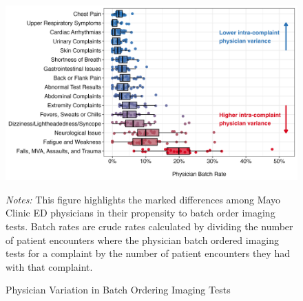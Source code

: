 \documentclass[,,nonblindrev]{informs}
\begin{document}
\begin{figure}[t] 
\centering
\caption{Physician Variation in Batch Ordering Imaging Tests}  
\includegraphics[width=\textwidth]{../outputs/figures/fig1_boxplot.png}
\label{fig:Variation}
\begin{tablenotes}
\item \footnotesize{\textit{Notes:} This figure highlights the marked differences among Mayo Clinic ED physicians in their propensity to batch order imaging tests. Batch rates are crude rates calculated by dividing the number of patient encounters where the physician batch ordered imaging tests for a complaint by the number of patient encounters they had with that complaint.}
\end{tablenotes}
\end{figure}
\end{document}
